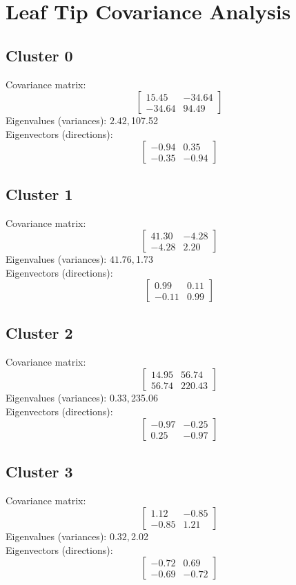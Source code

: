 \documentclass{article}
\begin{document}
\section*{Leaf Tip Covariance Analysis}
\subsection*{Cluster 0}
Covariance matrix:
\[\begin{bmatrix}15.45 & -34.64 \\-34.64 & 94.49\end{bmatrix}\]
Eigenvalues (variances): $ 2.42, $107.52\\
Eigenvectors (directions):
\[\begin{bmatrix}-0.94 & 0.35 \\-0.35 & -0.94\end{bmatrix}\]
\subsection*{Cluster 1}
Covariance matrix:
\[\begin{bmatrix}41.30 & -4.28 \\-4.28 & 2.20\end{bmatrix}\]
Eigenvalues (variances): $ 41.76, $1.73\\
Eigenvectors (directions):
\[\begin{bmatrix}0.99 & 0.11 \\-0.11 & 0.99\end{bmatrix}\]
\subsection*{Cluster 2}
Covariance matrix:
\[\begin{bmatrix}14.95 & 56.74 \\56.74 & 220.43\end{bmatrix}\]
Eigenvalues (variances): $ 0.33, $235.06\\
Eigenvectors (directions):
\[\begin{bmatrix}-0.97 & -0.25 \\0.25 & -0.97\end{bmatrix}\]
\subsection*{Cluster 3}
Covariance matrix:
\[\begin{bmatrix}1.12 & -0.85 \\-0.85 & 1.21\end{bmatrix}\]
Eigenvalues (variances): $ 0.32, $2.02\\
Eigenvectors (directions):
\[\begin{bmatrix}-0.72 & 0.69 \\-0.69 & -0.72\end{bmatrix}\]
\end{document}
